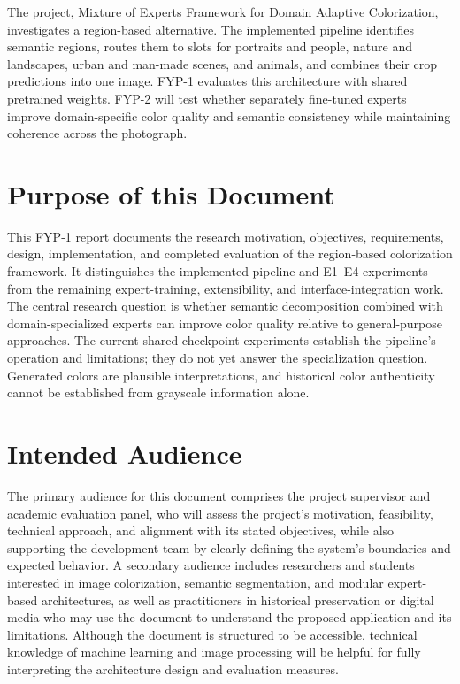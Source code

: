 \documentclass{FastFyp}
\begin{document}
The project, Mixture of Experts Framework for Domain Adaptive Colorization, investigates a region-based alternative. The implemented pipeline identifies semantic regions, routes them to slots for portraits and people, nature and landscapes, urban and man-made scenes, and animals, and combines their crop predictions into one image. FYP-1 evaluates this architecture with shared pretrained weights. FYP-2 will test whether separately fine-tuned experts improve domain-specific color quality and semantic consistency while maintaining coherence across the photograph.

\section{Purpose of this Document}
This FYP-1 report documents the research motivation, objectives, requirements, design, implementation, and completed evaluation of the region-based colorization framework. It distinguishes the implemented pipeline and E1--E4 experiments from the remaining expert-training, extensibility, and interface-integration work. The central research question is whether semantic decomposition combined with domain-specialized experts can improve color quality relative to general-purpose approaches. The current shared-checkpoint experiments establish the pipeline's operation and limitations; they do not yet answer the specialization question. Generated colors are plausible interpretations, and historical color authenticity cannot be established from grayscale information alone.
\section{Intended Audience}
The primary audience for this document comprises the project supervisor and academic evaluation panel, who will assess the project's motivation, feasibility, technical approach, and alignment with its stated objectives, while also supporting the development team by clearly defining the system's boundaries and expected behavior. A secondary audience includes researchers and students interested in image colorization, semantic segmentation, and modular expert-based architectures, as well as practitioners in historical preservation or digital media who may use the document to understand the proposed application and its limitations. Although the document is structured to be accessible, technical knowledge of machine learning and image processing will be helpful for fully interpreting the architecture design and evaluation measures.
\end{document}
